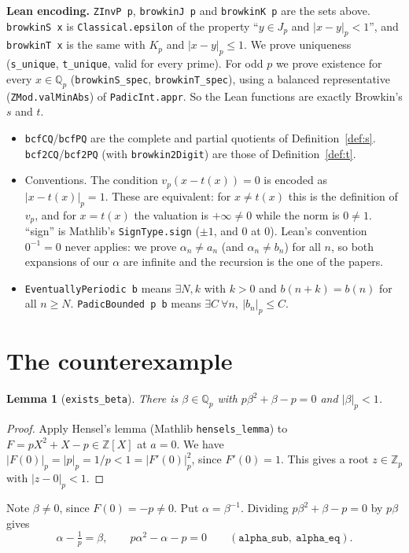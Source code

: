 \documentclass[11pt]{article}
\newtheorem{lemma}[theorem]{Lemma}
\theoremstyle{definition}
\newcommand{\Q}{\mathbb{Q}}
\newcommand{\Z}{\mathbb{Z}}
\begin{document}
\textbf{Lean encoding.} \texttt{ZInvP p}, \texttt{browkinJ p} and \texttt{browkinK p} are the sets above.
\texttt{browkinS x} is \texttt{Classical.epsilon} of the property ``$y\in J_p$ and $|x-y|_p<1$'', and
\texttt{browkinT x} is the same with $K_p$ and $|x-y|_p\le1$. We prove uniqueness (\texttt{s\_unique},
\texttt{t\_unique}, valid for every prime). For odd $p$ we prove existence for every $x\in\Q_p$
(\texttt{browkinS\_spec}, \texttt{browkinT\_spec}), using a balanced representative
(\texttt{ZMod.valMinAbs}) of \texttt{PadicInt.appr}. So the Lean functions are exactly Browkin's $s$ and $t$.
\begin{itemize}
\item \texttt{bcfCQ}/\texttt{bcfPQ} are the complete and partial quotients of Definition~\ref{def:s}.
  \texttt{bcf2CQ}/\texttt{bcf2PQ} (with \texttt{browkin2Digit}) are those of Definition~\ref{def:t}.
\item Conventions. The condition $v_p(x-t(x))=0$ is encoded as $|x-t(x)|_p=1$. These are equivalent: for
  $x\ne t(x)$ this is the definition of $v_p$, and for $x=t(x)$ the valuation is $+\infty\ne0$ while the norm is
  $0\ne1$. ``sign'' is Mathlib's \texttt{SignType.sign} ($\pm1$, and $0$ at $0$). Lean's convention
  $0^{-1}=0$ never applies: we prove $\alpha_n\ne a_n$ (and $\alpha_n\ne b_n$) for all $n$, so both expansions
  of our $\alpha$ are infinite and the recursion is the one of the papers.
\item \texttt{EventuallyPeriodic b} means $\exists N,k$ with $k>0$ and $b(n+k)=b(n)$ for all $n\ge N$.
  \texttt{PadicBounded p b} means $\exists C\ \forall n,\ |b_n|_p\le C$.
\end{itemize}

\section{The counterexample}

\begin{lemma}[\texttt{exists\_beta}]
There is $\beta\in\Q_p$ with $p\beta^2+\beta-p=0$ and $|\beta|_p<1$.
\end{lemma}
\begin{proof}
Apply Hensel's lemma (Mathlib \texttt{hensels\_lemma}) to $F=pX^2+X-p\in\Z[X]$ at $a=0$. We have
$|F(0)|_p=|p|_p=1/p<1=|F'(0)|_p^2$, since $F'(0)=1$. This gives a root $z\in\Z_p$ with $|z-0|_p<1$.
\end{proof}

Note $\beta\ne0$, since $F(0)=-p\ne0$. Put $\alpha=\beta^{-1}$. Dividing $p\beta^2+\beta-p=0$ by $p\beta$ gives
\begin{equation}\label{eq:key}
\alpha-\tfrac1p=\beta,\qquad p\alpha^2-\alpha-p=0 \qquad(\texttt{alpha\_sub},\ \texttt{alpha\_eq}).
\end{equation}
\end{document}

